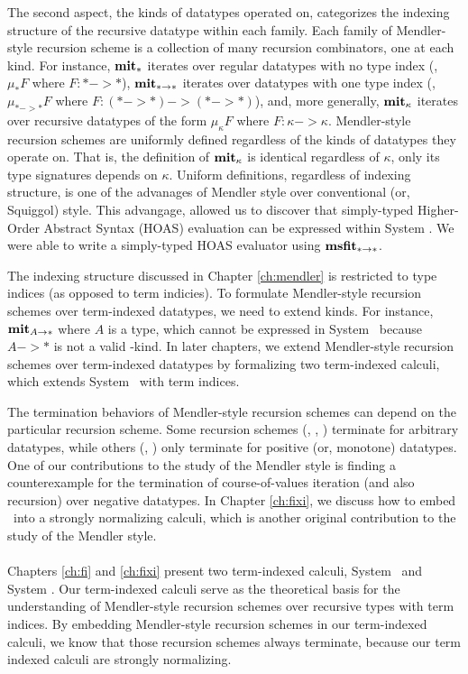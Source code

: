 The second aspect, the kinds of datatypes operated on, categorizes
the indexing structure
of the recursive datatype within each family. Each family of
Mendler-style recursion scheme is a collection of many recursion combinators,
one at each kind. For instance, $\mathbf{mit}_{*}$ iterates over regular datatypes
with no type index (\ie, $\mu_{*}F$ where $F : * -> *$), $\mathbf{mit}_{* -> *}$
iterates over datatypes with one type index (\ie, $\mu_{* -> *} F$ where
$F : (* -> *) -> (* -> *)$), and, more generally, $\mathbf{mit}_{\kappa}$ iterates
over recursive datatypes of the form $\mu_{\kappa}F$ where $F : \kappa -> \kappa$.
Mendler-style recursion schemes are uniformly defined regardless of the kinds
of datatypes they operate on. That is, the definition of $\mathbf{mit}_{\kappa}$ is
identical regardless of $\kappa$, only its type signatures depends on $\kappa$.
Uniform definitions, regardless of indexing structure,
is one of the advanages of Mendler style over conventional (or, Squiggol) style.
This advangage, allowed us to discover that simply-typed Higher-Order
Abstract Syntax (HOAS) evaluation can be expressed within System \Fw.
We were able to write a simply-typed HOAS evaluator using $\mathbf{msfit}_{* -> *}$.

The indexing structure discussed in Chapter \ref{ch:mendler} is restricted
to type indices (as opposed to term indicies). To formulate Mendler-style recursion
schemes over term-indexed datatypes, we need to extend kinds.
For instance, $\mathbf{mit}_{A -> *}$ where $A$ is a type, which cannot
be expressed in System \Fw\ because $A -> *$ is not a valid \Fw-kind.
In later chapters, we extend Mendler-style recursion schemes over
term-indexed datatypes by formalizing two term-indexed calculi, which extends
System \Fw\ with term indices.

The termination behaviors of Mendler-style recursion schemes can depend
on the particular recursion scheme. Some recursion schemes (\MIt, \MPr, \MsfIt) terminate
for arbitrary datatypes, while others (\McvPr, \McvIt) only terminate for
positive (or, monotone) datatypes. One of our contributions to
the study of the Mendler style is finding a counterexample for
the termination of course-of-values iteration (and also recursion) over 
negative datatypes. In Chapter \ref{ch:fixi}, we discuss how to embed
\McvPr\ into a strongly normalizing calculi, which is another original
contribution to the study of the Mendler style.

\paragraph{}
Chapters \ref{ch:fi} and \ref{ch:fixi} present two term-indexed calculi,
System \Fi\ and System \Fixi. Our term-indexed calculi serve as the
theoretical basis for the understanding of Mendler-style recursion schemes
over recursive types with term indices.
By embedding Mendler-style recursion schemes in our term-indexed calculi,
we know that those recursion schemes always terminate, because our term
indexed calculi are strongly normalizing.

